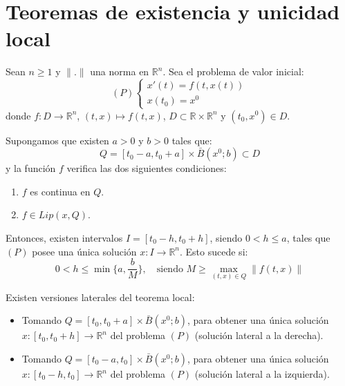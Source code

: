\chapter{Teoremas de existencia y unicidad local}
\begin{theorem}
    Sean $n \geq 1$ y $\|.\|$ una norma en $\mathbb{R}^n$.
    Sea el problema de valor inicial:
    $$(P) \begin{cases}
            x'(t) = f(t, x(t)) \\
            x(t_0) = x^0
        \end{cases}$$
    donde $f: D \to \mathbb{R}^n$, $(t, x) \mapsto f(t, x)$, $D \subset \mathbb{R} \times \mathbb{R}^n$ y $(t_0, x^0) \in D$.

    Supongamos que existen $a > 0$ y $b > 0$ tales que:
    $$Q = [t_0 - a, t_0 + a] \times \bar{B}(x^0; b) \subset D$$
    y la función $f$ verifica las dos siguientes condiciones:
    \begin{enumerate}
        \item $f$ es continua en $Q$.
        \item $f \in Lip(x, Q)$.
    \end{enumerate}
    Entonces, existen intervalos $I = [t_0 - h, t_0 + h]$, siendo $0 < h \leq a$, tales que $(P)$ posee una única solución $x: I \to \mathbb{R}^n$.
    Esto sucede si:
    $$0 < h \leq \min\{a, \frac{b}{M}\}, \quad \text{siendo } M \geq \max_{(t, x) \in Q} \|f(t, x)\|$$
\end{theorem}

\begin{remark}
    Existen versiones laterales del teorema local:
    \begin{itemize}
        \item Tomando $Q = [t_0, t_0 + a] \times \bar{B}(x^0; b)$, para obtener una única solución $x: [t_0, t_0 + h] \to \mathbb{R}^n$ del problema $(P)$ (solución lateral a la derecha).
        \item Tomando $Q = [t_0 - a, t_0] \times \bar{B}(x^0; b)$, para obtener una única solución $x: [t_0 - h, t_0] \to \mathbb{R}^n$ del problema $(P)$ (solución lateral a la izquierda).
    \end{itemize}
\end{remark}

